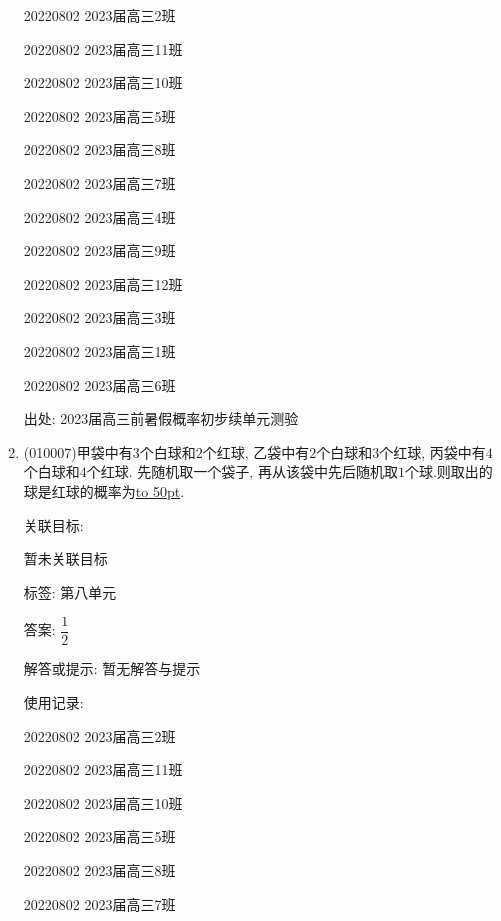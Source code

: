 \documentclass[10pt,a4paper]{article}
\newcommand{\blank}[1]{\underline{\hbox to #1pt{}}}
\begin{document}
\begin{enumerate}[1.]
20220802	2023届高三2班	

20220802	2023届高三11班	

20220802	2023届高三10班	

20220802	2023届高三5班	

20220802	2023届高三8班	

20220802	2023届高三7班	

20220802	2023届高三4班	

20220802	2023届高三9班	

20220802	2023届高三12班	

20220802	2023届高三3班	

20220802	2023届高三1班	

20220802	2023届高三6班	


出处: 2023届高三前暑假概率初步续单元测验
\item { (010007)}甲袋中有$3$个白球和$2$个红球, 乙袋中有$2$个白球和$3$个红球, 丙袋中有$4$个白球和$4$个红球. 先随机取一个袋子, 再从该袋中先后随机取$1$个球.则取出的球是红球的概率为\blank{50}.


关联目标:

暂未关联目标



标签: 第八单元

答案: $\dfrac 12$

解答或提示: 暂无解答与提示

使用记录:

20220802	2023届高三2班	

20220802	2023届高三11班	

20220802	2023届高三10班	

20220802	2023届高三5班	

20220802	2023届高三8班	

20220802	2023届高三7班	


\end{enumerate}
\end{document}
